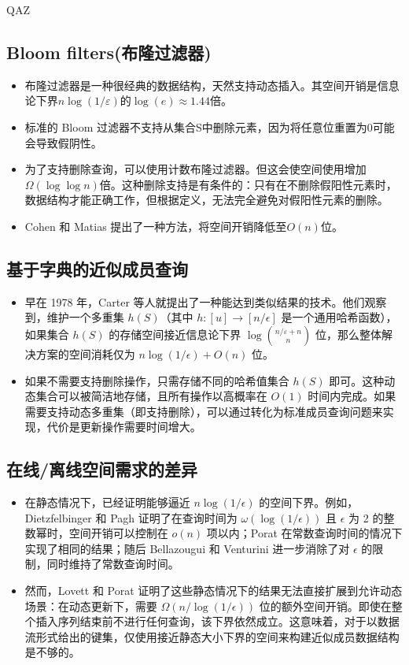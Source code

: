 QAZ\documentclass[UTF8,11pt,a4paper]{ctexart}
\begin{document}
\subsection{Bloom filters(布隆过滤器)}
\begin{itemize}
    \item 布隆过滤器是一种很经典的数据结构，天然支持动态插入。其空间开销是信息论下界$n\log(1/\varepsilon)$的$\log(e) \approx 1.44 $倍。
    \item 标准的 Bloom 过滤器不支持从集合S中删除元素，因为将任意位重置为0可能会导致假阴性。
    \item 为了支持删除查询，可以使用计数布隆过滤器。但这会使空间使用增加$\Omega(\log\log n)$倍。这种删除支持是有条件的：只有在不删除假阳性元素时，数据结构才能正确工作，但根据定义，无法完全避免对假阳性元素的删除。
    \item Cohen 和 Matias 提出了一种方法，将空间开销降低至$O(n)$位。
\end{itemize}

\subsection{基于字典的近似成员查询}
\begin{itemize}
    \item 早在 1978 年，Carter 等人就提出了一种能达到类似结果的技术。他们观察到，维护一个多重集 $h(S)$（其中 $h : [u] \to [n/\epsilon]$ 是一个通用哈希函数），如果集合 $h(S)$ 的存储空间接近信息论下界 $\log\binom{n/\varepsilon+n}{n}$ 位，那么整体解决方案的空间消耗仅为 $n\log(1/\epsilon) + O(n)$ 位。
    \item 如果不需要支持删除操作，只需存储不同的哈希值集合 $h(S)$ 即可。这种动态集合可以被简洁地存储，且所有操作以高概率在 $O(1)$ 时间内完成。如果需要支持动态多重集（即支持删除），可以通过转化为标准成员查询问题来实现，代价是更新操作需要时间增大。
\end{itemize}
\subsection{在线/离线空间需求的差异}
\begin{itemize}
    \item 在静态情况下，已经证明能够逼近 $n\log(1/\epsilon)$ 的空间下界。例如，Dietzfelbinger 和 Pagh 证明了在查询时间为 $\omega(\log(1/\epsilon))$ 且 $\epsilon$ 为 2 的整数幂时，空间开销可以控制在 $o(n)$ 项以内；Porat 在常数查询时间的情况下实现了相同的结果；随后 Bellazougui 和 Venturini 进一步消除了对 $\epsilon$ 的限制，同时维持了常数查询时间。
    \item 然而，Lovett 和 Porat 证明了这些静态情况下的结果无法直接扩展到允许动态场景：在动态更新下，需要 $\Omega(n/\log(1/\epsilon))$ 位的额外空间开销。即使在整个插入序列结束前不进行任何查询，该下界依然成立。这意味着，对于以数据流形式给出的键集，仅使用接近静态大小下界的空间来构建近似成员数据结构是不够的。
\end{itemize}
\end{document}
